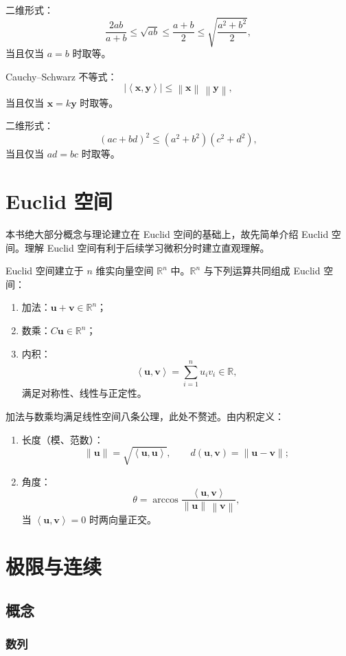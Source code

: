 \documentclass[UTF8,fontset=fandol,zihao=5]{ctexart}
\newcommand{\R}{\mathbb{R}}
\newcommand{\norm}[1]{\left\lVert#1\right\rVert}
\newcommand{\inner}[2]{\left\langle#1,#2\right\rangle}
\begin{document}
二维形式：
\[
\frac{2ab}{a+b}\leq\sqrt{ab}\leq\frac{a+b}{2}
\leq\sqrt{\frac{a^2+b^2}{2}},
\]
当且仅当 $a=b$ 时取等。

Cauchy--Schwarz 不等式：
\[
|\inner{\bm{x}}{\bm{y}}|\leq\norm{\bm{x}}\,\norm{\bm{y}},
\]
当且仅当 $\bm{x}=k\bm{y}$ 时取等。

二维形式：
\[
(ac+bd)^2\leq(a^2+b^2)(c^2+d^2),
\]
当且仅当 $ad=bc$ 时取等。

\section{Euclid 空间}

本书绝大部分概念与理论建立在 Euclid 空间的基础上，故先简单介绍 Euclid 空间。理解 Euclid 空间有利于后续学习微积分时建立直观理解。

Euclid 空间建立于 $n$ 维实向量空间 $\R^n$ 中。$\R^n$ 与下列运算共同组成 Euclid 空间：

\begin{enumerate}
  \item 加法：$\bm{u}+\bm{v}\in\R^n$；
  \item 数乘：$C\bm{u}\in\R^n$；
  \item 内积：
  \[
  \inner{\bm{u}}{\bm{v}}=\sum_{i=1}^{n}u_iv_i\in\R,
  \]
  满足对称性、线性与正定性。
\end{enumerate}

加法与数乘均满足线性空间八条公理，此处不赘述。由内积定义：

\begin{enumerate}
  \item 长度（模、范数）：
  \[
  \norm{\bm{u}}=\sqrt{\inner{\bm{u}}{\bm{u}}},
  \qquad d(\bm{u},\bm{v})=\norm{\bm{u}-\bm{v}};
  \]
  \item 角度：
  \[
  \theta=\arccos\frac{\inner{\bm{u}}{\bm{v}}}
  {\norm{\bm{u}}\,\norm{\bm{v}}},
  \]
  当 $\inner{\bm{u}}{\bm{v}}=0$ 时两向量正交。
\end{enumerate}

\section{极限与连续}

\subsection{概念}

\subsubsection{数列}
\end{document}
